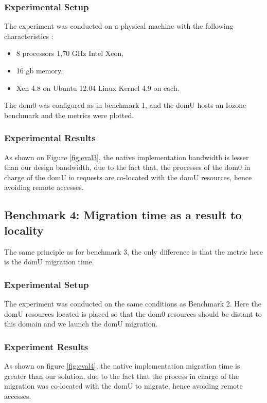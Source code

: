 \subsubsection{Experimental Setup}
The experiment was conducted on a physical machine with the following characteristics : 

\begin{itemize}
    \item 8 processors 1,70 GHz Intel Xeon,
    \item 16 \acrshort{gb} memory, 
    \item Xen 4.8 on Ubuntu 12.04 Linux Kernel 4.9 on each.
\end{itemize}

The dom0 was configured as in benchmark 1, and the domU hosts an Iozone benchmark and the metrics were plotted.


\subsubsection{Experimental Results}
As shown on Figure \ref{fig:eval3}, the native implementation bandwidth is lesser than our design bandwidth, due to the fact that, the processes of the dom0 in charge of the domU \acrshort{io} requests are co-located with the domU resources, hence avoiding remote accesses.

\subsection{Benchmark 4: Migration time as a result to locality}

The same principle as for benchmark 3, the only difference is that the metric here is the domU migration time.

\subsubsection{Experimental Setup}
The experiment was conducted on the same conditions as Benchmark 2. Here the domU resources located is placed so that the dom0 resources should be distant to this domain and we launch the domU migration. 

\subsubsection{Experiment Results}

As shown on figure \ref{fig:eval4}, the native implementation migration time is greater than our solution, due to the fact that the process in charge of the migration was co-located with the domU to migrate, hence avoiding remote accesses. 

